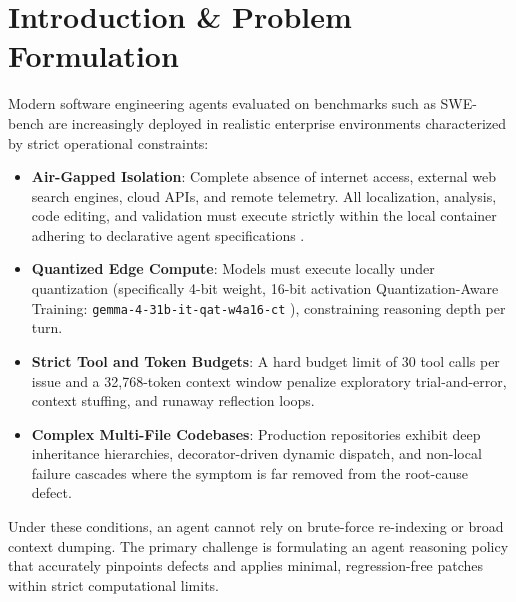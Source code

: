 \documentclass[10pt,twocolumn,letterpaper]{article}
\begin{document}
\section{Introduction \& Problem Formulation}
Modern software engineering agents evaluated on benchmarks such as SWE-bench \cite{jimenez2024swebench} are increasingly deployed in realistic enterprise environments characterized by strict operational constraints:
\begin{itemize}
    \item \textbf{Air-Gapped Isolation}: Complete absence of internet access, external web search engines, cloud APIs, and remote telemetry. All localization, analysis, code editing, and validation must execute strictly within the local container adhering to declarative agent specifications \cite{google2024adk}.
    \item \textbf{Quantized Edge Compute}: Models must execute locally under quantization (specifically 4-bit weight, 16-bit activation Quantization-Aware Training: \texttt{gemma-4-31b-it-qat-w4a16-ct} \cite{deepmind2024gemma}), constraining reasoning depth per turn.
    \item \textbf{Strict Tool and Token Budgets}: A hard budget limit of 30 tool calls per issue and a 32,768-token context window penalize exploratory trial-and-error, context stuffing, and runaway reflection loops.
    \item \textbf{Complex Multi-File Codebases}: Production repositories exhibit deep inheritance hierarchies, decorator-driven dynamic dispatch, and non-local failure cascades where the symptom is far removed from the root-cause defect.
\end{itemize}

Under these conditions, an agent cannot rely on brute-force re-indexing or broad context dumping. The primary challenge is formulating an agent reasoning policy that accurately pinpoints defects and applies minimal, regression-free patches within strict computational limits.
\end{document}
